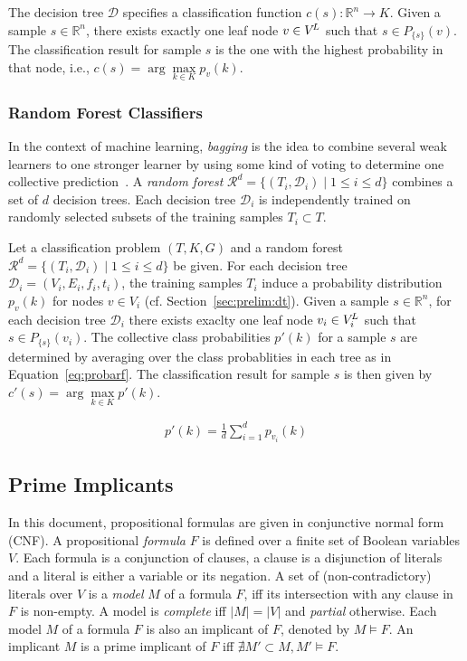 \documentclass{easychair}
\theoremstyle{definition}
\begin{document}
The decision tree $\mathcal{D}$ specifies a classification function $c(s) : \mathbb{R}^n \rightarrow K$. 
Given a sample $s \in \mathbb{R}^n$, there exists exactly one leaf node $v \in V^{\!L}$ such that $s \in P_{\!\{\!s\!\}}(v)$. 
The classification result for sample $s$ is the one with the highest probability in that node, i.e., $c(s) = \arg\max\limits_{k \in K} p_v(k)$. 


\subsubsection{Random Forest Classifiers}
\label{sec:prelim:rf}

In the context of machine learning, \emph{bagging} is the idea to combine several weak learners to one stronger learner by using some kind of voting to determine one collective prediction~\cite{Hastie:2009}. 
A \emph{random forest} $\mathcal{R}^d = \{ (T_i, \mathcal{D}_i) \mid 1 \leq i \leq d \}$ combines a set of $d$ decision trees. 
Each decision tree $\mathcal{D}_i$ is independently trained on randomly selected subsets of the training samples $T_i \subset T$. 

Let a classification problem $(T, K, G)$ and a random forest $\mathcal{R}^d = \{ (T_i, \mathcal{D}_i) \mid 1 \leq i \leq d \}$ be given. 
For each decision tree $\mathcal{D}_i = (V_i, E_i, f_i, t_i)$, the training samples $T_i$ induce a probability distribution $p_v(k)$ for nodes $v \in V_i$ (cf. Section~\ref{sec:prelim:dt}). Given a sample $s \in \mathbb{R}^n$, for each decision tree $\mathcal{D}_i$ there exists exaclty one leaf node $v_i \in V^{\!L}_i$ such that $s \in P_{\!\{\!s\!\}}(v_i)$. 
The collective class probabilities $p'(k)$ for a sample $s$ are determined by averaging over the class probablities in each tree as in Equation~\ref{eq:probarf}. 
The classification result for sample $s$ is then given by $c'(s) = \arg\max\limits_{k \in K} p'(k)$. 

\begin{align}
\label{eq:probarf}
p'(k) = \frac{1}{d}\sum\limits_{i = 1}^d p_{v_i}(k)
\end{align}


\subsection{Prime Implicants}
\label{sec:prelim:pi}

In this document, propositional formulas are given in conjunctive normal form (CNF). 
A propositional \emph{formula} $F$ is defined over a finite set of Boolean variables $V$. 
Each formula is a conjunction of clauses, a clause is a disjunction of literals and a literal is either a variable or its negation.  
A set of (non-contradictory) literals over $V$ is a \emph{model} $M$ of a formula $F$, iff its intersection with any clause in $F$ is non-empty. 
A model is \emph{complete} iff $|M| = |V|$ and \emph{partial} otherwise. 
Each model $M$ of a formula $F$ is also an implicant of $F$, denoted by $M \models F$. 
An implicant $M$ is a prime implicant of $F$ iff $\nexists M' \subset M, M' \models F$. 
\end{document}
